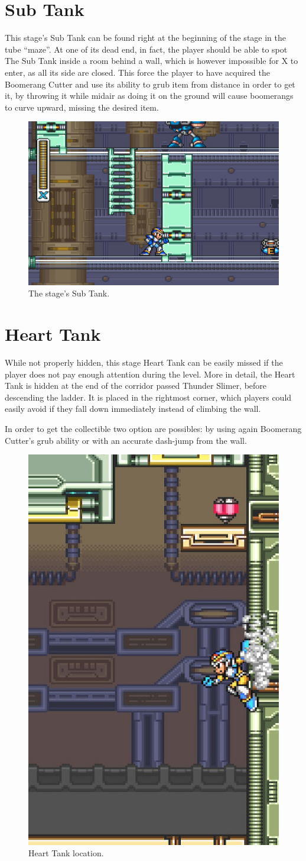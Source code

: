 \section{Sub Tank}
This stage's Sub Tank can be found right at the beginning of the stage in the tube ``maze''. At one of its dead end, in fact, the player should be able to spot The Sub Tank inside a room behind a wall, which is however impossible for X to enter, as all its side are closed. This force the player to have acquired the Boomerang Cutter and use its ability to grub item from distance in order to get it, by throwing it while midair as doing it on the ground will cause boomerangs to curve upward, missing the desired item.
\begin{figure}[htp]
	\centering
	\includegraphics[width=0.45\linewidth]{figures/X1/Spark_mandrill/Mandrill_tank.jpg}
	\caption{The stage's Sub Tank.}
\end{figure}

\section{Heart Tank}
While not properly hidden, this stage Heart Tank can be easily missed if the player does not pay enough attention during the level. More in detail, the Heart Tank is hidden at the end of the corridor passed Thunder Slimer, before descending the ladder. It is placed in the rightmost corner, which players could easily avoid if they fall down immediately instead of climbing the wall.

In order to get the collectible two option are possibles: by using again Boomerang Cutter's grub ability or with an accurate dash-jump from the wall.
\begin{figure}[htp]
	\centering
	\includegraphics[width=0.3\linewidth]{figures/X1/Spark_mandrill/Mandrill_heart.jpg}
	\caption{Heart Tank location.}
\end{figure}

